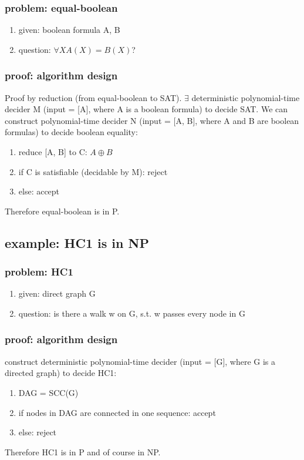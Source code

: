 \documentclass{article}
\begin{document}
\subsubsection{problem: equal-boolean}
\begin{enumerate}
	\item given: boolean formula A, B
	\item question: $ \forall X A(X) = B(X) $?
\end{enumerate}

\subsubsection{proof: algorithm design}
Proof by reduction (from equal-boolean to SAT).
$ \exists $ deterministic polynomial-time decider M (input = [A], where A is a 
boolean formula) to decide SAT. We can construct polynomial-time decider N 
(input = [A, B], where A and B are boolean formulas) to decide boolean equality:
\begin{enumerate}
	\item reduce [A, B] to C: $ A \oplus B $
	\item if C is satisfiable (decidable by M): reject
	\item else: accept
\end{enumerate}
Therefore equal-boolean is in P.

\subsection{example: HC1 is in NP}

\subsubsection{problem: HC1}
\begin{enumerate}
	\item given: direct graph G
	\item question: is there a walk w on G, s.t. w passes every node in G
\end{enumerate}

\subsubsection{proof: algorithm design}
construct deterministic polynomial-time decider (input = [G], where G is a 
directed graph) to decide HC1:
\begin{enumerate}
	\item DAG = SCC(G)
	\item if nodes in DAG are connected in one sequence: accept
	\item else: reject
\end{enumerate}
Therefore HC1 is in P and of course in NP.
\end{document}
